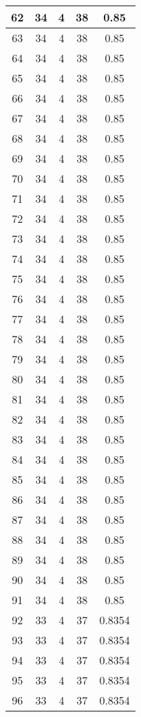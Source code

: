 \documentclass[letterpaper, 12pt]{article}
\begin{document}
\begin{longtable}{|c|c|c|c|c|}
\hline
62 & 34 & 4 & 38 & 0.85 \\
\hline
63 & 34 & 4 & 38 & 0.85 \\
\hline
64 & 34 & 4 & 38 & 0.85 \\
\hline
65 & 34 & 4 & 38 & 0.85 \\
\hline
66 & 34 & 4 & 38 & 0.85 \\
\hline
67 & 34 & 4 & 38 & 0.85 \\
\hline
68 & 34 & 4 & 38 & 0.85 \\
\hline
69 & 34 & 4 & 38 & 0.85 \\
\hline
70 & 34 & 4 & 38 & 0.85 \\
\hline
71 & 34 & 4 & 38 & 0.85 \\
\hline
72 & 34 & 4 & 38 & 0.85 \\
\hline
73 & 34 & 4 & 38 & 0.85 \\
\hline
74 & 34 & 4 & 38 & 0.85 \\
\hline
75 & 34 & 4 & 38 & 0.85 \\
\hline
76 & 34 & 4 & 38 & 0.85 \\
\hline
77 & 34 & 4 & 38 & 0.85 \\
\hline
78 & 34 & 4 & 38 & 0.85 \\
\hline
79 & 34 & 4 & 38 & 0.85 \\
\hline
80 & 34 & 4 & 38 & 0.85 \\
\hline
81 & 34 & 4 & 38 & 0.85 \\
\hline
82 & 34 & 4 & 38 & 0.85 \\
\hline
83 & 34 & 4 & 38 & 0.85 \\
\hline
84 & 34 & 4 & 38 & 0.85 \\
\hline
85 & 34 & 4 & 38 & 0.85 \\
\hline
86 & 34 & 4 & 38 & 0.85 \\
\hline
87 & 34 & 4 & 38 & 0.85 \\
\hline
88 & 34 & 4 & 38 & 0.85 \\
\hline
89 & 34 & 4 & 38 & 0.85 \\
\hline
90 & 34 & 4 & 38 & 0.85 \\
\hline
91 & 34 & 4 & 38 & 0.85 \\
\hline
92 & 33 & 4 & 37 & 0.8354 \\
\hline
93 & 33 & 4 & 37 & 0.8354 \\
\hline
94 & 33 & 4 & 37 & 0.8354 \\
\hline
95 & 33 & 4 & 37 & 0.8354 \\
\hline
96 & 33 & 4 & 37 & 0.8354 \\

\end{longtable}
\end{document}
